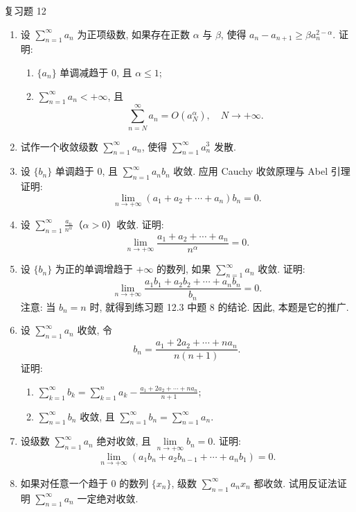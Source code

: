 \begin{exblock}{复习题 12}
\begin{enumerate}
  \item 设 $\sum_{n=1}^{\infty}a_{n}$ 为正项级数, 如果存在正数 $\alpha$ 与 $\beta$, 使得 $a_{n}-a_{n+1}\geqslant\beta a_{n}^{2-\alpha}$. 证明:
  \begin{enumerate}
    \item $\{a_{n}\}$ 单调减趋于 $0$, 且 $\alpha\leqslant1$;
    \item $\sum_{n=1}^{\infty}a_{n}<+\infty$, 且
    \[
      \sum_{n=N}^{\infty}a_{n}=O(a_{N}^{\alpha}),\quad N\to+\infty.
\]
  \end{enumerate}
  \item 试作一个收敛级数 $\sum_{n=1}^{\infty}a_{n}$, 使得 $\sum_{n=1}^{\infty}a_{n}^{3}$ 发散.
  \item 设 $\{b_{n}\}$ 单调趋于 $0$, 且 $\sum_{n=1}^{\infty}a_{n}b_{n}$ 收敛. 应用 Cauchy 收敛原理与 Abel 引理证明:
  \[
    \lim_{n\to+\infty}(a_{1}+a_{2}+\cdots+a_{n})b_{n}=0.
\]
  \item 设 $\sum_{n=1}^{\infty}\frac{a_{n}}{n^{\alpha}}$（$\alpha>0$）收敛. 证明:
  \[
    \lim_{n\to+\infty}\frac{a_{1}+a_{2}+\cdots+a_{n}}{n^{\alpha}}=0.
\]
  \item 设 $\{b_{n}\}$ 为正的单调增趋于 $+\infty$ 的数列, 如果 $\sum_{n=1}^{\infty}a_{n}$ 收敛. 证明:
  \[
    \lim_{n\to+\infty}\frac{a_{1}b_{1}+a_{2}b_{2}+\cdots+a_{n}b_{n}}{b_{n}}=0.
\]
  注意: 当 $b_{n}=n$ 时, 就得到练习题 12.3 中题 8 的结论. 因此, 本题是它的推广.
  \item 设 $\sum_{n=1}^{\infty}a_{n}$ 收敛, 令
  \[
    b_{n}=\frac{a_{1}+2a_{2}+\cdots+na_{n}}{n(n+1)}.
\]
  证明:
  \begin{enumerate}
    \item $\sum_{k=1}^{\infty}b_{k}=\sum_{k=1}^{n}a_{k}-\frac{a_{1}+2a_{2}+\cdots+na_{n}}{n+1}$;
    \item $\sum_{n=1}^{\infty}b_{n}$ 收敛, 且 $\sum_{n=1}^{\infty}b_{n}=\sum_{n=1}^{\infty}a_{n}$.
  \end{enumerate}
  \item 设级数 $\sum_{n=1}^{\infty}a_{n}$ 绝对收敛, 且 $\lim\limits_{n\to+\infty}b_{n}=0$. 证明:
  \[
    \lim_{n\to+\infty}(a_{1}b_{n}+a_{2}b_{n-1}+\cdots+a_{n}b_{1})=0.
\]
  \item 如果对任意一个趋于 $0$ 的数列 $\{x_{n}\}$, 级数 $\sum_{n=1}^{\infty}a_{n}x_{n}$ 都收敛. 试用反证法证明 $\sum_{n=1}^{\infty}a_{n}$ 一定绝对收敛.


\end{enumerate}
\end{exblock}
